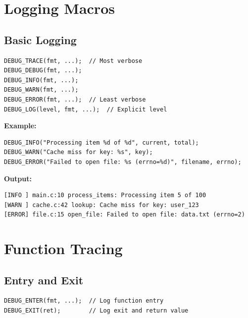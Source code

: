 \documentclass[11pt,a4paper]{article}
\begin{document}
\section{Logging Macros}

\subsection{Basic Logging}

\begin{tcolorbox}[title=Logging Macros]
\begin{lstlisting}[numbers=none]
DEBUG_TRACE(fmt, ...);  // Most verbose
DEBUG_DEBUG(fmt, ...);
DEBUG_INFO(fmt, ...);
DEBUG_WARN(fmt, ...);
DEBUG_ERROR(fmt, ...);  // Least verbose
DEBUG_LOG(level, fmt, ...);  // Explicit level
\end{lstlisting}
\end{tcolorbox}

\textbf{Example:}
\begin{lstlisting}
DEBUG_INFO("Processing item %d of %d", current, total);
DEBUG_WARN("Cache miss for key: %s", key);
DEBUG_ERROR("Failed to open file: %s (errno=%d)", filename, errno);
\end{lstlisting}

\textbf{Output:}
\begin{verbatim}
[INFO ] main.c:10 process_items: Processing item 5 of 100
[WARN ] cache.c:42 lookup: Cache miss for key: user_123
[ERROR] file.c:15 open_file: Failed to open file: data.txt (errno=2)
\end{verbatim}

\section{Function Tracing}

\subsection{Entry and Exit}

\begin{tcolorbox}[title=Function Tracing Macros]
\begin{lstlisting}[numbers=none]
DEBUG_ENTER(fmt, ...);  // Log function entry
DEBUG_EXIT(ret);        // Log exit and return value
\end{lstlisting}
\end{tcolorbox}
\end{document}
